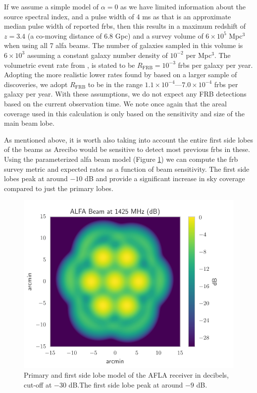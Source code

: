 \documentclass[a4paper,fleqn,usenatbib]{mnras}
\begin{document}
If we assume a simple model of $\alpha=0$ as we have limited information about
the source spectral index, and a pulse width of 4 ms as that is an approximate
median pulse width of reported \glspl{frb}, then this results in a maximum
redshift of $z=3.4$ (a co-moving distance of 6.8 Gpc) and a survey volume of $6
\times 10^5$ Mpc$^3$ when using all 7 \gls{alfa} beams. The number of galaxies
sampled in this volume is $6 \times 10^3$ assuming a constant galaxy number
density of $10^{-2}$ per Mpc$^3$.  The volumetric event rate from
\cite{2013Sci...341...53T}, is stated to be $R_{\textrm{FRB}} = 10^{-3}$
\glspl{frb} per galaxy per year. Adopting the more realistic lower rates found
by \cite{2016MNRAS.460.3370C} based on a larger sample of discoveries, we adopt
$R_{\textrm{FRB}}$ to be in the range $1.1 \times 10^{-4}$---$7.0 \times
10^{-4}$ \glspl{frb} per galaxy per year.  With these assumptions, we do not
expect any FRB detections based on the current observation time. We note once
again that the areal coverage used in this calculation is only based on the
sensitivity and size of the main beam lobe.

As mentioned above, it is worth also taking into account the entire
first side lobes of the beams as Arecibo would be sensitive to detect
most previous \glspl{frb} in these. Using the parameterized \gls{alfa}
beam model (Figure \ref{fig:alfa_beam}) \citep{GALFAbeam} we can
compute the \gls{frb} survey metric and expected rates as a function
of beam sensitivity.  The first side lobes peak at around $-10$ dB and
provide a significant increase in sky coverage compared to just the
primary lobes.

\begin{figure}
    \includegraphics[width=1.0\linewidth]{figures/ALFA_beam_1425MHz_dB.pdf}
    \caption{Primary and first side lobe model of the AFLA receiver in
    decibels, cut-off at $-30$ dB.The first side lobe peak at around $-9$ dB.
    }
    \label{fig:alfa_beam}
\end{figure}
\end{document}
